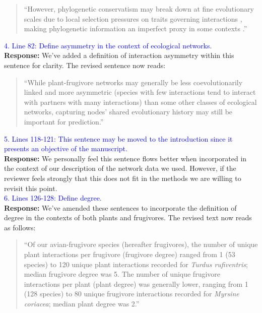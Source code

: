 \documentclass{article}
\begin{document}
\begin{quote}
“However, phylogenetic conservatism may break down at fine evolutionary scales due to local selection pressures on traits governing interactions \citep{perez2007phylogenetic}, making phylogenetic information an imperfect proxy in some contexts \citep{rafferty2013}.”
\end{quote}

\textcolor{blue}{4. Line 82: Define asymmetry in the context of ecological networks.} \\
\textbf{Response:} We’ve added a definition of interaction asymmetry within this sentence for clarity. The revised sentence now reads: 
\begin{quote}
    “While plant-frugivore networks may generally be less coevolutionarily linked and more asymmetric (species with few interactions tend to interact with partners with many interactions) than some other classes of ecological networks\cite{maglianesi2024phylogenetic, jordano1987patterns, wheelwright1982seed}, capturing nodes' shared evolutionary history may still be important for prediction.”
\end{quote}


\textcolor{blue}{5. Lines 118-121: This sentence may be moved to the introduction since it presents an objective of the manuscript.} \\
\textbf{Response:} We personally feel this sentence flows better when incorporated in the context of our description of the network data we used. However, if the reviewer feels strongly that this does not fit in the methods we are willing to revisit this point. \\

\textcolor{blue}{6. Lines 126-128: Define degree.} \\
\textbf{Response:} We’ve amended these sentences to incorporate the definition of degree in the contexts of both plants and frugivores. The revised text now reads as follows: 
\begin{quote}
“Of our avian-frugivore species (hereafter frugivores), the number of unique plant interactions per frugivore (frugivore degree) ranged from 1 (53 species) to 120 unique plant interactions recorded for \emph{Turdus rufiventris}; median frugivore degree was 5. The number of unique frugivore interactions per plant (plant degree) was generally lower, ranging from 1 (128 species) to 80 unique frugivore interactions recorded for \emph{Myrsine coriacea}; median plant degree was 2.”    
\end{quote}
\end{document}

